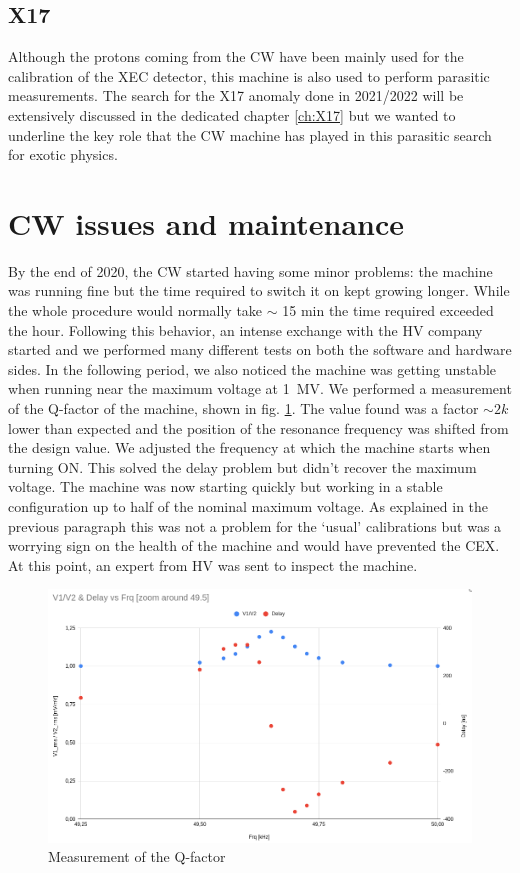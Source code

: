 \begin{refsection}
\subsection{X17}
Although the protons coming from the CW have been mainly used for the calibration of the XEC detector, this machine is also used to perform parasitic measurements.
The search for the X17 anomaly done in 2021/2022 will be extensively discussed in the dedicated chapter \ref{ch:X17} but we wanted to underline the key role that the CW machine has played in this parasitic search for exotic physics. 

\section{CW issues and maintenance}
By the end of 2020, the CW started having some minor problems: the machine was running fine but the time required to switch it on kept growing longer. 
While the whole procedure would normally take $\sim$ 15 min the time required exceeded the hour.
Following this behavior, an intense exchange with the HV company started and we performed many different tests on both the software and hardware sides.
In the following period, we also noticed the machine was getting unstable when running near the maximum voltage at \SI{1}{MV}.
We performed a measurement of the Q-factor of the machine, shown in fig. \ref{fig:CW:Q-factor}. The value found was a factor $\sim2k$ lower than expected and the position of the resonance frequency was shifted from the design value.
We adjusted the frequency at which the machine starts when turning ON. 
This solved the delay problem but didn't recover the maximum voltage. 
The machine was now starting quickly but working in a stable configuration up to half of the nominal maximum voltage.
As explained in the previous paragraph this was not a problem for the `usual' calibrations but was a worrying sign on the health of the machine and would have prevented the CEX.
At this point, an expert from HV was sent to inspect the machine.

\begin{figure}
    \centering
    \includegraphics[width=1\textwidth]{Figures/MEG/CW/CW_Q-factor.png}
    \caption{Measurement of the Q-factor}
    \label{fig:CW:Q-factor}
\end{figure}


\end{refsection}
